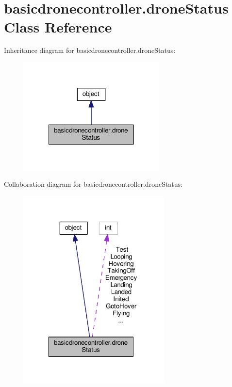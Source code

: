 \hypertarget{classbasicdronecontroller_1_1droneStatus}{\section{basicdronecontroller.\-drone\-Status Class Reference}
\label{classbasicdronecontroller_1_1droneStatus}
}


Inheritance diagram for basicdronecontroller.\-drone\-Status\-:
\nopagebreak
\begin{figure}[H]
\begin{center}
\leavevmode
\includegraphics[width=210pt]{classbasicdronecontroller_1_1droneStatus__inherit__graph}
\end{center}
\end{figure}


Collaboration diagram for basicdronecontroller.\-drone\-Status\-:
\nopagebreak
\begin{figure}[H]
\begin{center}
\leavevmode
\includegraphics[width=217pt]{classbasicdronecontroller_1_1droneStatus__coll__graph}
\end{center}
\end{figure}
